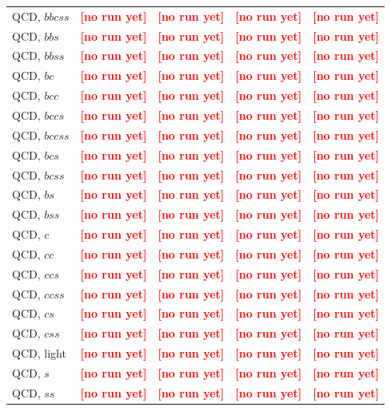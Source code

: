 \documentclass[12pt]{article}   %
\newcommand{\pending}[1]{\textcolor{red}{\textbf{[#1]}}}
\begin{document}
\begin{landscape}
{\begin{longtable}{@{\extracolsep{\fill}}lcccc@{}}
QCD, $bbcss$ & \pending{no run yet} & \pending{no run yet} & \pending{no run yet} & \pending{no run yet} \\
QCD, $bbs$ & \pending{no run yet} & \pending{no run yet} & \pending{no run yet} & \pending{no run yet} \\
QCD, $bbss$ & \pending{no run yet} & \pending{no run yet} & \pending{no run yet} & \pending{no run yet} \\
QCD, $bc$ & \pending{no run yet} & \pending{no run yet} & \pending{no run yet} & \pending{no run yet} \\
QCD, $bcc$ & \pending{no run yet} & \pending{no run yet} & \pending{no run yet} & \pending{no run yet} \\
QCD, $bccs$ & \pending{no run yet} & \pending{no run yet} & \pending{no run yet} & \pending{no run yet} \\
QCD, $bccss$ & \pending{no run yet} & \pending{no run yet} & \pending{no run yet} & \pending{no run yet} \\
QCD, $bcs$ & \pending{no run yet} & \pending{no run yet} & \pending{no run yet} & \pending{no run yet} \\
QCD, $bcss$ & \pending{no run yet} & \pending{no run yet} & \pending{no run yet} & \pending{no run yet} \\
QCD, $bs$ & \pending{no run yet} & \pending{no run yet} & \pending{no run yet} & \pending{no run yet} \\
QCD, $bss$ & \pending{no run yet} & \pending{no run yet} & \pending{no run yet} & \pending{no run yet} \\
QCD, $c$ & \pending{no run yet} & \pending{no run yet} & \pending{no run yet} & \pending{no run yet} \\
QCD, $cc$ & \pending{no run yet} & \pending{no run yet} & \pending{no run yet} & \pending{no run yet} \\
QCD, $ccs$ & \pending{no run yet} & \pending{no run yet} & \pending{no run yet} & \pending{no run yet} \\
QCD, $ccss$ & \pending{no run yet} & \pending{no run yet} & \pending{no run yet} & \pending{no run yet} \\
QCD, $cs$ & \pending{no run yet} & \pending{no run yet} & \pending{no run yet} & \pending{no run yet} \\
QCD, $css$ & \pending{no run yet} & \pending{no run yet} & \pending{no run yet} & \pending{no run yet} \\
QCD, light & \pending{no run yet} & \pending{no run yet} & \pending{no run yet} & \pending{no run yet} \\
QCD, $s$ & \pending{no run yet} & \pending{no run yet} & \pending{no run yet} & \pending{no run yet} \\
QCD, $ss$ & \pending{no run yet} & \pending{no run yet} & \pending{no run yet} & \pending{no run yet} \\
\end{longtable}
}
\end{landscape}
\end{document}
